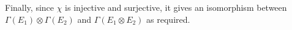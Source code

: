 \begin{frame}

    Finally, since \(\chi\) is injective and surjective, it gives an isomorphism
    between \(\Gamma(E_1) \otimes\Gamma(E_2)\) and \(\Gamma(E_1 \otimes E_2)\)
    as required.


\end{frame}